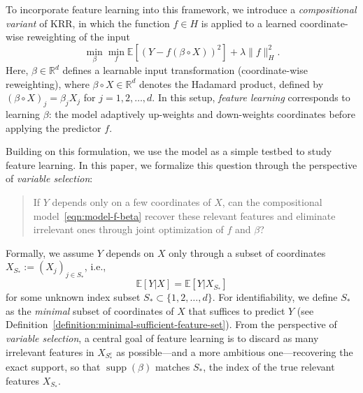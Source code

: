 \documentclass[sn-mathphys-num]{sn-jnl}%
\numberwithin{equation}{section}
\newcommand{\R}{\mathbb{R}}
\newcommand{\E}{\mathbb{E}}
\theoremstyle{thmstyleone}%
\theoremstyle{thmstyletwo}%
\theoremstyle{thmstylethree}%
\begin{document}
To incorporate feature learning into this framework, we introduce a \emph{compositional variant} of KRR, in which the function $f \in H$ is applied to a learned coordinate-wise reweighting of the input
\begin{equation}
\label{eqn:model-f-beta}
	\min_{\beta} \min_f \mathbb{E}\left[(Y - f(\beta \circ X))^2\right] + \lambda \|f\|_H^2.
\end{equation}
Here, $\beta \in \R^d$ defines a learnable input transformation (coordinate-wise reweighting), where $\beta \circ X \in \R^d$ denotes the Hadamard product, defined by $(\beta \circ X)_j = \beta_j X_j$ for $j = 1, 2, \ldots, d$. In this setup, \emph{feature learning} corresponds to learning $\beta$: the model adaptively up-weights and down-weights coordinates before applying the predictor $f$. 

Building on this formulation, we use the model as a simple testbed to study feature learning. In this paper, we formalize this question through the perspective of \emph{variable selection}: 
\begin{quote}
	If $Y$ depends only on a few coordinates of $X$, can the compositional model~\eqref{eqn:model-f-beta} recover these relevant features and eliminate irrelevant ones through joint optimization of $f$ and $\beta$?
\end{quote} 
Formally, we assume $Y$ depends on $X$ only through a subset of coordinates
$X_{S_*}:= (X_j)_{j \in {S_*}}$, i.e., 
\begin{equation}
\label{eqn:sparse-setup}
	\E[Y|X] = \E[Y|X_{S_*}]
\end{equation}
 for some unknown index subset $S_* \subset \{1, 2, \ldots, d\}$. For identifiability, 
we define $S_*$ as the \emph{minimal} subset of coordinates of $X$ that suffices to predict $Y$ %
(see Definition~\ref{definition:minimal-sufficient-feature-set}). 
From the perspective of \emph{variable selection}, a central goal of feature learning is to discard as 
many irrelevant features in $X_{S_*^c}$ as possible---and a more ambitious one---recovering the exact 
support, so that $\operatorname{supp}(\beta)$ matches $S_*$, the index of the true relevant features $X_{S_*}$. 

\end{document}
